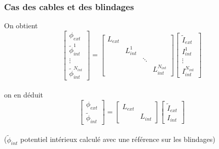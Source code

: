 \begin{frame}
\frametitle{Cas des cables et des blindages}
On obtient
\[ \left[ \begin{array} {c}
\phi_{ext} \\
\tilde{\phi}^1_{int}  \\
\vdots \\
\tilde{\phi}^{N_{int}}_{int} \end{array}  \right]  =
\left[ \begin{array} {cccc}
L_{ext} & & & \\
  & L^1_{int}& &  \\
 & &\ddots &  \\
 & & & L^{N_{int}}_{int} \end{array}  \right]
 \left[ \begin{array} {c}
\tilde{I}_{ext} \\
I^1_{int}  \\
\vdots \\
I^{N_{int}}_{int} \end{array}  \right]
\] \\[0.6cm]
on en d\'eduit
\[ \left[ \begin{array} {c}
\phi_{ext} \\
\tilde{\phi}_{int} \end{array}  \right]  =
\left[ \begin{array} {cc}
L_{ext} & \\
  & L_{int}  \end{array}  \right]
 \left[ \begin{array} {c}
\tilde{I}_{ext} \\
I_{int} \end{array}  \right]
\] \\[0.6cm]
($\tilde{\phi}_{int}$ potentiel int\'erieux calcul\'e avec une r\'ef\'erence sur les blindages)
\end{frame}


